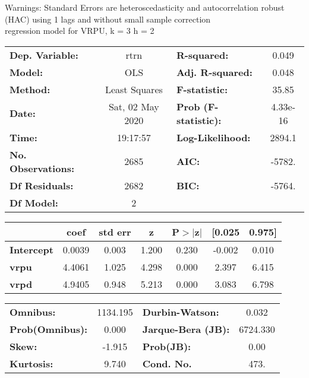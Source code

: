 Warnings: \newline
 [1] Standard Errors are heteroscedasticity and autocorrelation robust (HAC) using 1 lags and without small sample correction\\ 

regression model for VRPU, k = 3 h = 2\begin{center}
\begin{tabular}{lclc}
\toprule
\textbf{Dep. Variable:}    &       rtrn       & \textbf{  R-squared:         } &     0.049   \\
\textbf{Model:}            &       OLS        & \textbf{  Adj. R-squared:    } &     0.048   \\
\textbf{Method:}           &  Least Squares   & \textbf{  F-statistic:       } &     35.85   \\
\textbf{Date:}             & Sat, 02 May 2020 & \textbf{  Prob (F-statistic):} &  4.33e-16   \\
\textbf{Time:}             &     19:17:57     & \textbf{  Log-Likelihood:    } &    2894.1   \\
\textbf{No. Observations:} &        2685      & \textbf{  AIC:               } &    -5782.   \\
\textbf{Df Residuals:}     &        2682      & \textbf{  BIC:               } &    -5764.   \\
\textbf{Df Model:}         &           2      & \textbf{                     } &             \\
\bottomrule
\end{tabular}
\begin{tabular}{lcccccc}
                   & \textbf{coef} & \textbf{std err} & \textbf{z} & \textbf{P$> |$z$|$} & \textbf{[0.025} & \textbf{0.975]}  \\
\midrule
\textbf{Intercept} &       0.0039  &        0.003     &     1.200  &         0.230        &       -0.002    &        0.010     \\
\textbf{vrpu}      &       4.4061  &        1.025     &     4.298  &         0.000        &        2.397    &        6.415     \\
\textbf{vrpd}      &       4.9405  &        0.948     &     5.213  &         0.000        &        3.083    &        6.798     \\
\bottomrule
\end{tabular}
\begin{tabular}{lclc}
\textbf{Omnibus:}       & 1134.195 & \textbf{  Durbin-Watson:     } &    0.032  \\
\textbf{Prob(Omnibus):} &   0.000  & \textbf{  Jarque-Bera (JB):  } & 6724.330  \\
\textbf{Skew:}          &  -1.915  & \textbf{  Prob(JB):          } &     0.00  \\
\textbf{Kurtosis:}      &   9.740  & \textbf{  Cond. No.          } &     473.  \\
\bottomrule
\end{tabular}
\end{center}

